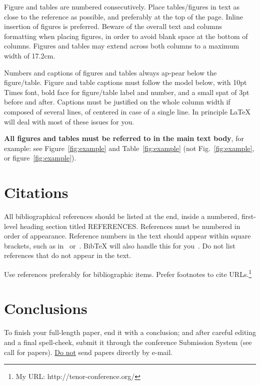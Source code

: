 \documentclass{article}
\begin{document}
Figure and tables are numbered consecutively. Place tables/figures in text as close to the reference as possible, and preferably at the top of the page. Inline insertion of figures is preferred. Beware of the overall text and columns formatting when placing figures, in order to avoid blank space at the bottom of columns. 
Figures and tables may extend across both columns to a maximum width of 17.2cm.

Numbers and captions of figures and tables always ap-pear below the figure/table. Figure and table captions must follow the model below, with 10pt Times font, bold face for figure/table label and number, and a small spat of 3pt before and after. Captions must be justified on the whole column width if composed of several lines, of centered in case of a single line. 
In principle \LaTeX{} will deal with most of these issues for you.

\textbf{All figures and tables must be referred to in the main text body}, for example: see Figure~\ref{fig:example} and Table~\ref{fig:example} (not Fig.~\ref{fig:example}, or figure~\ref{fig:example}). 





\section{Citations}

All bibliographical references should be listed at the end, inside a numbered, first-level heading section titled REFERENCES.
References must be numbered in order of appearance. 
Reference numbers in the text should appear within square brackets, such as in~\cite{Someone:13} or~\cite{Someone:13,Someone:04,Someone:09}.
BibTeX will also handle this for you~\cite{ref:4,ref:online}.
Do not list references that do not appear in the text. 

Use references preferably for bibliographic items. Prefer footnotes to cite URLs.\footnote{My URL: http://tenor-conference.org/} 



\section{Conclusions}
To finish your full-length paper, end it with a conclusion; 
and after careful editing and a final spell-cheek,
submit it through the conference Submission System (see call for papers). 
\underline{Do not} send papers directly by e-mail.
\end{document}
